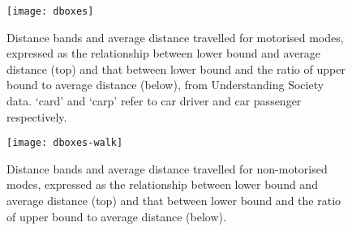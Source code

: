 \begin{figure}[htbp]
\begin{center}
    \texttt{[image: dboxes]}\end{center}
  \caption[Distance bands and average distance travelled for motorised modes]
  {Distance bands and average distance travelled for motorised modes, expressed
  as the relationship between lower bound and average distance (top)
  and that between lower bound and the ratio of upper bound to average distance
  (below), from Understanding Society data. `card' and `carp' refer to
car driver and car passenger respectively.} %
  \label{fdboxes}
\end{figure}

\begin{figure}[htbp]
\begin{center}
    \texttt{[image: dboxes-walk]}  \end{center}
  \caption[Distance bands and average distance travelled for active modes]
  {Distance bands and average distance travelled for non-motorised modes, expressed
  as the relationship between lower bound and average distance (top)
  and that between lower bound and the ratio of upper bound to average distance
  (below).} %
 \label{fdboxes2}
\end{figure}

% 

